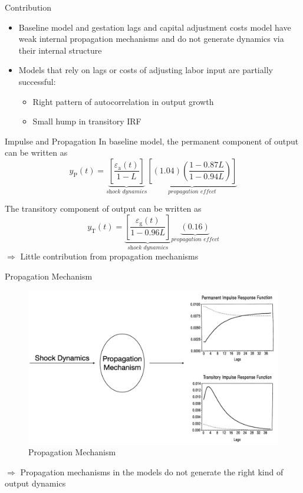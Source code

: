 \documentclass[10pt]{beamer}
\begin{document}
		      		\begin{frame}{Contribution}
		      			\begin{itemize}
		      				\item Baseline model and gestation lags and capital adjustment costs model have weak
		      				      internal propagation mechanisms and do not generate dynamics via their internal
		      				      structure
		      				\item Models that rely on lags or costs of adjusting labor input are partially
		      				      successful:
		      				      \begin{itemize}
		      				      	\item Right pattern of autocorrelation in output growth
		      				      	\item Small hump in transitory IRF
		      				      \end{itemize}
		      			\end{itemize}
		      			
		      		\end{frame}
		      		
		      		\begin{frame}{Impulse and Propagation}
		      			In baseline model, the permanent component of output can be written as
		      			$$
		      			y_{\mathrm{P}}(t)=\underbrace{\left[\frac{\varepsilon_{\mathrm{a}}(t)}{1-L}\right]}_{\textit{shock dynamics}}\underbrace{\left[(1.04)\left(\frac{1-0.87 L}{1-0.94 L}\right)\right]}_{\textit{propagation effect}}
		      			$$
		      			
		      			The transitory component of output can be written as $$
		      			y_{\mathrm{T}}(t)=\underbrace{\left[\frac{\varepsilon_{\mathrm{g}}(t)}{1-0.96
		      				L}\right]}_{\textit{shock dynamics}}\underbrace{(0.16)}_{\textit{propagation
		      				effect}} $$ $\Rightarrow$ Little contribution from propagation mechanisms
		      			
		      		\end{frame}
		      		
		      		\begin{frame}{Propagation Mechanism}
		      			\begin{figure}
		      				\centering
		      				\includegraphics[width=0.8\linewidth]{figures/propagation0.png}
		      				\caption{Propagation Mechanism}
		      			\end{figure}
		      			
		      			$\Rightarrow$ Propagation mechanisms in the models do not generate the right kind of output dynamics
		      		\end{frame}
		      		
\end{document}
